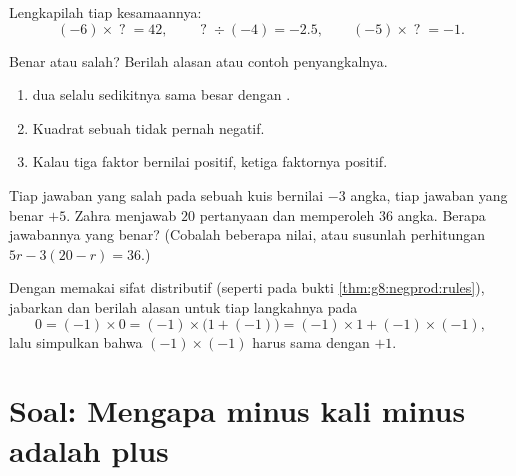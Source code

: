 \begin{exercise}[$\star\star$]\label{exo:g8:negprod:8}
Lengkapilah tiap kesamaannya:
\[
(-6) \times \;?\; = 42, \qquad
\;?\; \div (-4) = -2.5, \qquad
(-5) \times \;?\; = -1 .
\]
\end{exercise}

\begin{exercise}[$\star\star$]\label{exo:g8:negprod:9}
Benar atau salah? Berilah alasan atau contoh penyangkalnya.
\begin{enumerate}
  \item {} dua  selalu sedikitnya sama besar
        dengan .
  \item Kuadrat sebuah  tidak pernah negatif.
  \item Kalau  tiga faktor bernilai positif, ketiga
        faktornya positif.
\end{enumerate}
\end{exercise}

\begin{exercise}[$\star\star$]\label{exo:g8:negprod:10}
Tiap jawaban yang salah pada sebuah kuis bernilai $-3$ angka, tiap
jawaban yang benar $+5$. Zahra menjawab $20$ pertanyaan dan
memperoleh $36$ angka. Berapa jawabannya yang benar? (Cobalah
beberapa nilai, atau susunlah perhitungan
$5r - 3(20 - r) = 36$.)
\end{exercise}

\begin{exercise}[$\star\star\star$]\label{exo:g8:negprod:11}
Dengan memakai sifat distributif (seperti pada bukti
\cref{thm:g8:negprod:rules}), jabarkan dan berilah alasan untuk tiap
langkahnya pada
\[
0 = (-1) \times 0 = (-1) \times \bigl(1 + (-1)\bigr)
= (-1) \times 1 + (-1) \times (-1),
\]
lalu simpulkan bahwa $(-1) \times (-1)$ harus sama dengan $+1$.
\end{exercise}

\section{Soal: Mengapa minus kali minus adalah plus}

